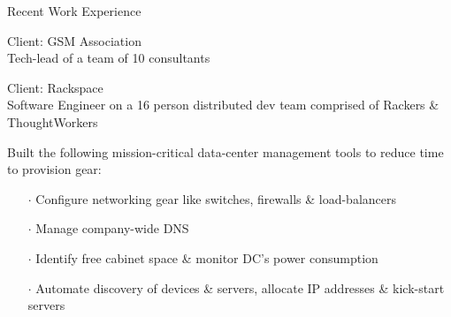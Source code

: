 \documentclass{resume} %
\begin{document}
\begin{rSection}{Recent Work Experience}
\begin{rSubsection}{}{}{}{}{Client: GSM Association\\Tech-lead of a team of 10 consultants}
\end{rSubsection}\vspace{-1em}



\begin{rSubsection}{}{}{}{}
{Client: Rackspace\\Software Engineer on a 16 person distributed dev team comprised of Rackers \& ThoughtWorkers}

\item Built the following mission-critical data-center management tools to reduce time to provision gear:
\vspace{-0.5em}
\begin{itemize}  \itemsep0.5pt \parskip0pt
    \item[$\cdot$] Configure networking gear like switches, firewalls \& load-balancers
    \item[$\cdot$] Manage company-wide DNS
    \item[$\cdot$] Identify free cabinet space \& monitor DC's power consumption
    \item[$\cdot$] Automate discovery of devices \& servers, allocate IP addresses \& kick-start servers
\end{itemize}

\end{rSubsection}








\end{rSection}
\end{document}
